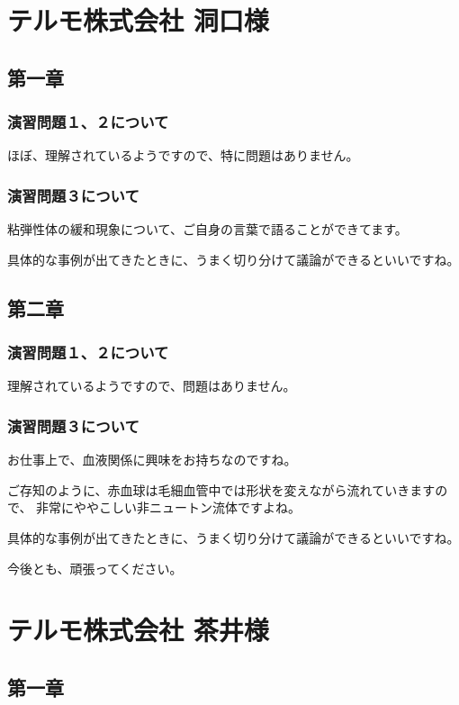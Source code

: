 \documentclass[uplatex,dvipdfmx,a4paper,11pt]{jsreport}
\begin{document}
\clearpage

\section*{テルモ株式会社 洞口様}
\subsection*{第一章}
\subsubsection*{演習問題１、２について}
ほぼ、理解されているようですので、特に問題はありません。

\subsubsection*{演習問題３について}
粘弾性体の緩和現象について、ご自身の言葉で語ることができてます。

具体的な事例が出てきたときに、うまく切り分けて議論ができるといいですね。

\subsection*{第二章}
\subsubsection*{演習問題１、２について}
理解されているようですので、問題はありません。

\subsubsection*{演習問題３について}

お仕事上で、血液関係に興味をお持ちなのですね。

ご存知のように、赤血球は毛細血管中では形状を変えながら流れていきますので、
非常にややこしい非ニュートン流体ですよね。

具体的な事例が出てきたときに、うまく切り分けて議論ができるといいですね。

今後とも、頑張ってください。

\clearpage

\section*{テルモ株式会社 茶井様}
\subsection*{第一章}
\end{document}
